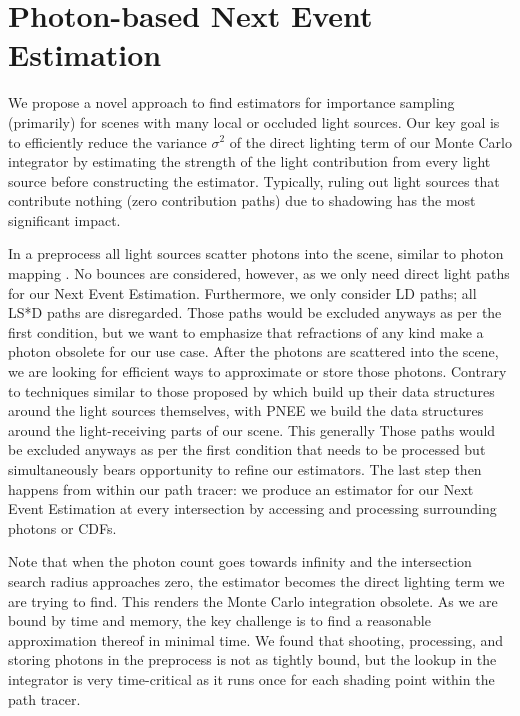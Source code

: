 
\chapter{Photon-based Next Event Estimation}
\label{ch:PNEE}

We propose a novel approach to find estimators for importance sampling (primarily) for scenes with many local or occluded light sources. Our key goal is to efficiently reduce the variance $\sigma^2$ of the direct lighting term of our Monte Carlo integrator by estimating the strength of the light contribution from every light source before constructing the estimator. Typically, ruling out light sources that contribute nothing (zero contribution paths) due to shadowing has the most significant impact.

In a preprocess all light sources scatter photons into the scene, similar to photon mapping \parencite{jensen2001realistic}. No bounces are considered, however, as we only need direct light paths for our Next Event Estimation. Furthermore, we only consider LD paths; all LS*D paths are disregarded. Those paths would be excluded anyways as per the first condition, but we want to emphasize that refractions of any kind make a photon obsolete for our use case. After the photons are scattered into the scene, we are looking for efficient ways to approximate or store those photons. Contrary to techniques similar to those proposed by \textcite{Estevez} which build up their data structures around the light sources themselves, with PNEE we build the data structures around the light-receiving parts of our scene. This generally Those paths would be excluded anyways as per the first condition that needs to be processed but simultaneously bears opportunity to refine our estimators. The last step then happens from within our path tracer: we produce an estimator for our Next Event Estimation at every intersection by accessing and processing surrounding photons or CDFs.

Note that when the photon count goes towards infinity and the intersection search radius approaches zero, the estimator becomes the direct lighting term we are trying to find. This renders the Monte Carlo integration obsolete. As we are bound by time and memory, the key challenge is to find a reasonable approximation thereof in minimal time. We found that shooting, processing, and storing photons in the preprocess is not as tightly bound, but the lookup in the integrator is very time-critical as it runs once for each shading point within the path tracer.



